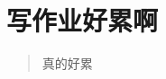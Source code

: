 \documentclass{article}
\title{
\vspace{2in}
\textmd{\textbf{\hmwkClass \  \hmwkTitle}}\\
\Large\vspace{0.1in}\large{\hmwkDueDate}\\
\vspace{2.5in}
}
\author{\textbf{\hmwkAuthorName}}
\date{\hmwkClassTime}
\begin{document}
\maketitle


\newpage
\tableofcontents
\newpage

\section{写作业好累啊}
\begin{quote}
    真的好累
\end{quote}
\end{document}
